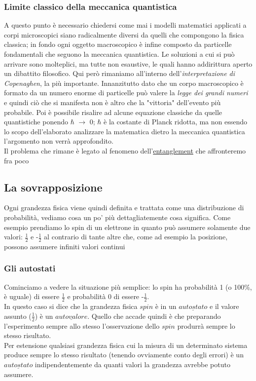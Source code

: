 \subsubsection{Limite classico della meccanica quantistica}
A questo punto è necessario chiedersi come mai i modelli matematici applicati a corpi microscopici siano radicalmente diversi da quelli che compongono la fisica classica; in fondo ogni oggetto macroscopico è infine composto da particelle fondamentali che seguono la meccanica quantistica.
Le soluzioni a cui si può arrivare sono molteplici, ma tutte non esaustive, le quali hanno addirittura aperto un dibattito filosofico. Qui però rimaniamo all'interno dell'\textit{interpretazione di Copenaghen}, la più importante. Innanzitutto dato che un corpo macroscopico è formato da un numero enorme di particelle può valere la \textit{legge dei grandi numeri} e quindi ciò che si manifesta non è altro che la "vittoria" dell'evento più probabile. Poi è possibile risalire ad alcune equazione classiche da quelle quantistiche ponendo $\hbar$ $\to$ 0; $\hbar$ è la costante di Planck ridotta, ma non essendo lo scopo dell'elaborato analizzare la matematica dietro la meccanica quantistica l'argomento non verrà approfondito.\\
Il problema che rimane è legato al fenomeno dell'\hyperref[sec:entanglement]{entanglement} che affronteremo fra poco
\subsection{La sovrapposizione}
Ogni grandezza fisica viene quindi definita e trattata come una distribuzione di probabilità, vediamo cosa un po' più dettagliatemente cosa significa. Come esempio prendiamo lo spin di un elettrone in quanto può assumere solamente due valori: $\frac{1}{2}$ e -$\frac{1}{2}$ al contrario di tante altre che, come ad esempio la posizione, possono assumere infiniti valori continui
\subsubsection{Gli autostati}
Cominciamo a vedere la situazione più semplice: lo spin ha probabilità 1 (o 100\%, è uguale) di essere $\frac{1}{2}$ e probabilità 0 di essere -$\frac{1}{2}$.\\
In questo caso si dice che la grandezza fisica $\textit{spin}$ è in un $\underline{autostato}$ e il valore assunto ($\frac{1}{2}$) è un $\underline{autovalore}$. Quello che accade quindi è che preparando l'esperimento sempre allo stesso l'osservazione dello $\textit{spin}$ produrrà sempre lo stesso risultato.\\
Per estensione qualsiasi grandezza fisica cui la misura di un determinato sistema produce sempre lo stesso risultato (tenendo ovviamente conto degli errori) è un $\underline{autostato}$ indipendentemente da quanti valori la grandezza avrebbe potuto assumere.
